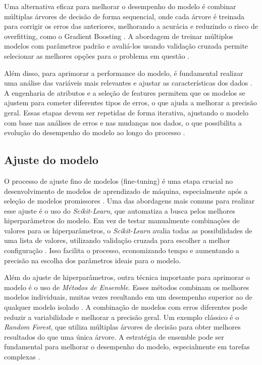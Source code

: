 Uma alternativa eficaz para melhorar o desempenho do modelo é combinar múltiplas árvores de decisão de forma sequencial, onde cada árvore é treinada para corrigir os erros das anteriores, melhorando a acurácia e reduzindo o risco de overfitting, como o Gradient Boosting \cite{geron2017}. A abordagem de treinar múltiplos modelos com parâmetros padrão e avaliá-los usando validação cruzada permite selecionar as melhores opções para o problema em questão \cite{geron2017}.

Além disso, para aprimorar a performance do modelo, é fundamental realizar uma análise das variáveis mais relevantes e ajustar as características dos dados \cite{geron2017}. A engenharia de atributos e a seleção de features permitem que os modelos se ajustem para cometer diferentes tipos de erros, o que ajuda a melhorar a precisão geral. Essas etapas devem ser repetidas de forma iterativa, ajustando o modelo com base nas análises de erros e nas mudanças nos dados, o que possibilita a evolução do desempenho do modelo ao longo do processo \cite{geron2017}.

\subsection{Ajuste do modelo}

O processo de ajuste fino de modelos (fine-tuning) é uma etapa crucial no desenvolvimento de modelos de aprendizado de máquina, especialmente após a seleção de modelos promissores \cite{geron2017}. Uma das abordagens mais comuns para realizar esse ajuste é o uso do \textit{Scikit-Learn}, que automatiza a busca pelos melhores hiperparâmetros do modelo. Em vez de testar manualmente combinações de valores para os hiperparâmetros, o \textit{Scikit-Learn} avalia todas as possibilidades de uma lista de valores, utilizando validação cruzada para escolher a melhor configuração \cite{geron2017}. Isso facilita o processo, economizando tempo e aumentando a precisão na escolha dos parâmetros ideais para o modelo.

Além do ajuste de hiperparâmetros, outra técnica importante para aprimorar o modelo é o uso de \textit{Métodos de Ensemble}. Esses métodos combinam os melhores modelos individuais, muitas vezes resultando em um desempenho superior ao de qualquer modelo isolado \cite{geron2017}. A combinação de modelos com erros diferentes pode reduzir a variabilidade e melhorar a precisão geral. Um exemplo clássico é o \textit{Random Forest}, que utiliza múltiplas árvores de decisão para obter melhores resultados do que uma única árvore. A estratégia de ensemble pode ser fundamental para melhorar o desempenho do modelo, especialmente em tarefas complexas \cite{geron2017}.

